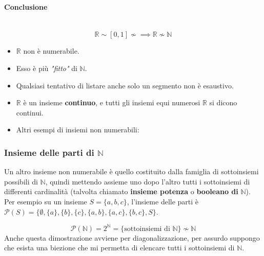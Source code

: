 \documentclass{article}
\begin{document}
\paragraph{Conclusione}\mbox{}\\
$$\mathbb{R}\sim[0,1]\nsim\implies\mathbb{R}\nsim\mathbb{N}$$
\begin{itemize}
    \item $\mathbb{R}$ non è numerabile.
    \item Esso è più \textit{"fitto"} di $\mathbb{N}$.
    \item Qualsiasi tentativo di listare anche solo un segmento non è esaustivo.
    \item $\mathbb{R}$ è un insieme \textbf{continuo}, e tutti gli insiemi equi numerosi
          $\mathbb{R}$ si dicono continui.
    \item Altri esempi di insiemi non numerabili:
\end{itemize}

\subsubsection{Insieme delle parti di $\mathbb{N}$}
Un altro insieme non numerabile è quello costituito dalla famiglia di sottoinsiemi possibili di $\mathbb{N}$,
quindi mettendo assieme uno dopo l'altro tutti i sottoinsiemi di differenti cardinalità (talvolta chiamato
\textbf{insieme potenza} o \textbf{booleano di} $\mathbb{N}$). Per esempio su un insieme $S=\{a,b,c\}$,
l'insieme delle parti è $\mathcal{P}(S)=\{\emptyset,\{a\},\{b\},\{c\},\{a,b\},\{a,c\},\{b,c\},S\}$.

$$\mathcal{P}(\mathbb{N})=2^{\mathbb{N}} = \{\text{sottoinsiemi di }\mathbb{N}\}\nsim\mathbb{N}$$
Anche questa dimostrazione avviene per diagonalizzazione, per assurdo suppongo che esista una
biezione che mi permetta di elencare tutti i sottoinsiemi di $\mathbb{N}$.
\end{document}
